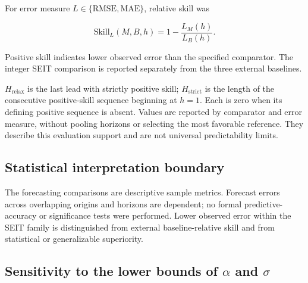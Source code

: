 \documentclass[pdflatex,sn-mathphys-ay,lineno]{sn-jnl}
\begin{document}
For error measure $L\in\{\mathrm{RMSE},\mathrm{MAE}\}$, relative skill was

\[
\mathrm{Skill}_L(M,B,h)=1-\frac{L_M(h)}{L_B(h)}.
\]

Positive skill indicates lower observed error than the specified comparator. The integer SEIT comparison is reported separately from the three external baselines.

$H_{\mathrm{relax}}$ is the last lead with strictly positive skill; $H_{\mathrm{strict}}$ is the length of the consecutive positive-skill sequence beginning at $h=1$. Each is zero when its defining positive sequence is absent. Values are reported by comparator and error measure, without pooling horizons or selecting the most favorable reference. They describe this evaluation support and are not universal predictability limits.

\subsection{Statistical interpretation boundary}

The forecasting comparisons are descriptive sample metrics. Forecast errors across overlapping origins and horizons are dependent; no formal predictive-accuracy or significance tests were performed. Lower observed error within the SEIT family is distinguished from external baseline-relative skill and from statistical or generalizable superiority.

\subsection{Sensitivity to the lower bounds of \texorpdfstring{$\alpha$}{alpha} and \texorpdfstring{$\sigma$}{sigma}}\label{sec:sensmethods}
\end{document}
